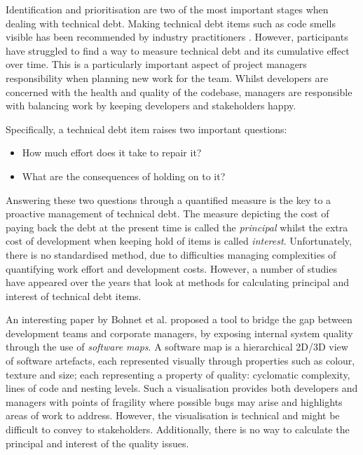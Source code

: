 \documentclass{mprop}
\begin{document}

Identification and prioritisation are two of the most important stages when
dealing with technical debt. Making technical debt items such as code smells
visible has been recommended by industry practitioners \cite{Lim2012}
\cite{Codabux2013}. However, participants have struggled to find a way to
measure technical debt and its cumulative effect over time. This is a
particularly important aspect of project managers responsibility when planning
new work for the team. Whilst developers are concerned with the health and
quality of the codebase, managers are responsible with balancing work by keeping
developers and stakeholders happy.

Specifically, a technical debt item raises two important questions:
\begin{itemize}
	\item How much effort does it take to repair it?
	\item What are the consequences of holding on to it?
\end{itemize}

Answering these two questions through a quantified measure is the key to a
proactive management of technical debt. The measure depicting the cost of paying
back the debt at the present time is called the \textit{principal} whilst the
extra cost of development when keeping hold of items is called
\textit{interest}. Unfortunately, there is no standardised method, due to
difficulties managing complexities of quantifying work effort and development
costs. However, a number of studies have appeared over the years that look at
methods for calculating principal and interest of technical debt items.

An interesting paper by Bohnet et al. \cite{Bohnet2011} proposed a tool to
bridge the gap between development teams and corporate managers, by exposing
internal system quality through the use of \textit{software maps}. A software
map is a hierarchical 2D/3D view of software artefacts, each represented
visually through properties such as colour, texture and size; each representing
a property of quality: cyclomatic complexity, lines of code and nesting levels.
Such a visualisation provides both developers and managers with points of
fragility where possible bugs may arise and highlights areas of work to address.
However, the visualisation is technical and might be difficult to convey to
stakeholders. Additionally, there is no way to calculate the principal and
interest of the quality issues.
\end{document}
